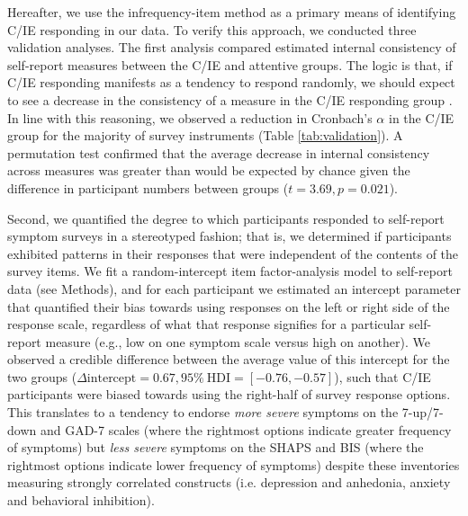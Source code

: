\documentclass[a4paper,notitlepage,12pt]{article}
\begin{document}
Hereafter, we use the infrequency-item method as a primary means of identifying C/IE responding in our data. To verify this approach, we conducted three validation analyses. The first analysis compared estimated internal consistency of self-report measures between the C/IE and attentive groups. The logic is that, if C/IE responding manifests as a tendency to respond randomly, we should expect to see a decrease in the consistency of a measure in the C/IE responding group \cite{maniaci2014caring, desimone2018dirty, desimone2018differential}. In line with this reasoning, we observed a reduction in Cronbach's $\alpha$ in the C/IE group for the majority of survey instruments (Table \ref{tab:validation}). A permutation test confirmed that the average decrease in internal consistency across measures was greater than would be expected by chance given the difference in participant numbers between groups ($t = 3.69, p = 0.021$). 

Second, we quantified the degree to which participants responded to self-report symptom surveys in a stereotyped fashion; that is, we determined if participants exhibited patterns in their responses that were independent of the contents of the survey items. We fit a random-intercept item factor-analysis model \cite{maydeu2006random} to self-report data (see Methods), and for each participant we estimated an intercept parameter that quantified their bias towards using responses on the left or right side of the response scale, regardless of what that response signifies for a particular self-report measure (e.g., low on one symptom scale versus high on another). We observed a credible difference between the average value of this intercept for the two groups ($\Delta \text{intercept} = 0.67, 95\% \ \text{HDI} = [-0.76, -0.57]$), such that C/IE participants were biased towards using the right-half of survey response options. This translates to a tendency to endorse \emph{more severe} symptoms on the 7-up/7-down and GAD-7 scales (where the rightmost options indicate greater frequency of symptoms) but \emph{less severe} symptoms on the SHAPS and BIS (where the rightmost options indicate lower frequency of symptoms) despite these inventories measuring strongly correlated constructs (i.e. depression and anhedonia, anxiety and behavioral inhibition).
\end{document}
